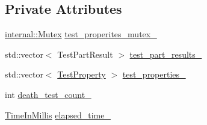 \subsection*{Private Attributes}
\begin{DoxyCompactItemize}
\item 
\mbox{\hyperlink{classtesting_1_1internal_1_1_mutex}{internal\+::\+Mutex}} \mbox{\hyperlink{classtesting_1_1_test_result_a58d7d97bd16a04b932e2863153c13dff}{test\+\_\+properites\+\_\+mutex\+\_\+}}
\item 
std\+::vector$<$ Test\+Part\+Result $>$ \mbox{\hyperlink{classtesting_1_1_test_result_ad7a136d3cdf71132cfc88b0e7339a41c}{test\+\_\+part\+\_\+results\+\_\+}}
\item 
std\+::vector$<$ \mbox{\hyperlink{classtesting_1_1_test_property}{Test\+Property}} $>$ \mbox{\hyperlink{classtesting_1_1_test_result_a28b5431b388a34e0308e7c1392b4dee3}{test\+\_\+properties\+\_\+}}
\item 
int \mbox{\hyperlink{classtesting_1_1_test_result_a3810b34e68f5dca9ad1237a5bde7fa21}{death\+\_\+test\+\_\+count\+\_\+}}
\item 
\mbox{\hyperlink{namespacetesting_a992de1d091ce660f451d1e8b3ce30fd6}{Time\+In\+Millis}} \mbox{\hyperlink{classtesting_1_1_test_result_a739a8ca54db4be004ba748b11e82b056}{elapsed\+\_\+time\+\_\+}}
\end{DoxyCompactItemize}

